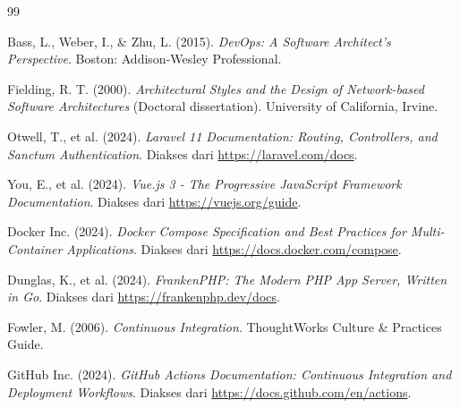\documentclass[a4paper,oneside,11pt]{book}
\begin{document}
\begin{thebibliography}{99}

Bass, L., Weber, I., \& Zhu, L. (2015). \textit{DevOps: A Software Architect's Perspective}. Boston: Addison-Wesley Professional.

Fielding, R. T. (2000). \textit{Architectural Styles and the Design of Network-based Software Architectures} (Doctoral dissertation). University of California, Irvine.

Otwell, T., et al. (2024). \textit{Laravel 11 Documentation: Routing, Controllers, and Sanctum Authentication}. Diakses dari \url{https://laravel.com/docs}.

You, E., et al. (2024). \textit{Vue.js 3 - The Progressive JavaScript Framework Documentation}. Diakses dari \url{https://vuejs.org/guide}.

Docker Inc. (2024). \textit{Docker Compose Specification and Best Practices for Multi-Container Applications}. Diakses dari \url{https://docs.docker.com/compose}.

Dunglas, K., et al. (2024). \textit{FrankenPHP: The Modern PHP App Server, Written in Go}. Diakses dari \url{https://frankenphp.dev/docs}.

Fowler, M. (2006). \textit{Continuous Integration}. ThoughtWorks Culture \& Practices Guide.

GitHub Inc. (2024). \textit{GitHub Actions Documentation: Continuous Integration and Deployment Workflows}. Diakses dari \url{https://docs.github.com/en/actions}.

\end{thebibliography}
\end{document}
